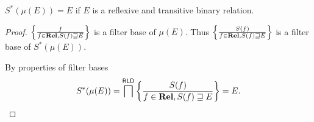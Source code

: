 \begin{thm}
  $S^{\ast} (\mu (E)) = E$ if $E$ is a reflexive and transitive binary
  relation.
\end{thm}

\begin{proof}
  $\left\{ \frac{ f }{ f \in \mathbf{Rel}, S (f)
  \sqsupseteq E }\right\}$ is a filter base of $\mu (E)$. Thus $\left\{ \frac{ S
  (f) }{ f \in \mathbf{Rel}, S (f)
  \sqsupseteq E }\right\}$ is a filter base of $S^{\ast} (\mu (E))$.

  By properties of filter bases
  \[ S^{\ast} (\mu (E)) = \bigsqcap^{\mathsf{RLD}} \left\{ \frac{ S (f)
     }{ f \in \mathbf{Rel}, S (f)
     \sqsupseteq E }\right\} = E. \]
\end{proof}
